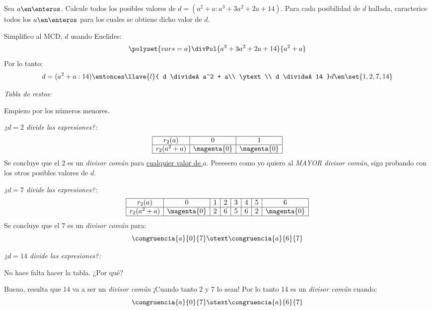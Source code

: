 \begin{enunciado}{\ejExtra}
  Sea $a \en \enteros$. Calcule todos los posibles valores de $d = (a^2 + a : a^3 + 3a^2 + 2a + 14)$. Para
  cada posibilidad de $d$ hallada, caracterice todos los $a \en \enteros$ para los cuales se obtiene dicho valor de $d$.
\end{enunciado}

Simplifico al MCD, $d$ usando Euclides:
$$
  \polyset{vars=a}
  \divPol{a^3 + 3a^2 + 2a + 14}{a^2 + a}
$$
Por lo tanto:
$$
  d = (a^2 + a :  14)
  \entonces
  \llave{l}{
    d \divideA a^2 + a\\
    \ytext\\
    d \divideA 14
  }
  d \en \set{1,2,7,14}
$$

\bigskip

\textit{Tabla de restos:}

Empiezo por los números menores.

\medskip

\textit{¿$d = 2$ divide las expresiones?:}
$$
  \begin{array}{|c|c|c|}
    \hline
    r_2(a)       & 0           & 1           \\\hline
    r_2(a^2 + a) & \magenta{0} & \magenta{0} \\\hline
  \end{array}
$$
Se concluye que el 2 es un \textit{divisor común} para \underline{cualquier valor de $a$}. Peeeeero como yo quiero al \textit{MAYOR divisor común}, sigo
probando con los otros posibles valores de $d$.

\medskip

\textit{¿$d = 7$ divide las expresiones?:}
$$
  \begin{array}{|c|c|c|c|c|c|c|c|}
    \hline
    r_2(a)       & 0           & 1 & 2 & 3 & 4 & 5 & 6           \\\hline
    r_2(a^2 + a) & \magenta{0} & 2 & 6 & 5 & 6 & 2 & \magenta{0} \\\hline
  \end{array}
$$
Se concluye que el 7 es un \textit{divisor común} para:
$$
  \congruencia{a}{0}{7}
  \otext
  \congruencia{a}{6}{7}
$$

\medskip

\textit{¿$d = 14$ divide las expresiones?:}

No hace falta hacer la tabla. ¿Por qué?

Bueno, resulta que 14 va a ser un \textit{divisor común} ¡Cuando tanto 2 y 7 lo sean! Por
lo tanto 14 es un \textit{divisor común} cuando:
$$
  \congruencia{a}{0}{7}
  \otext
  \congruencia{a}{6}{7}
$$


